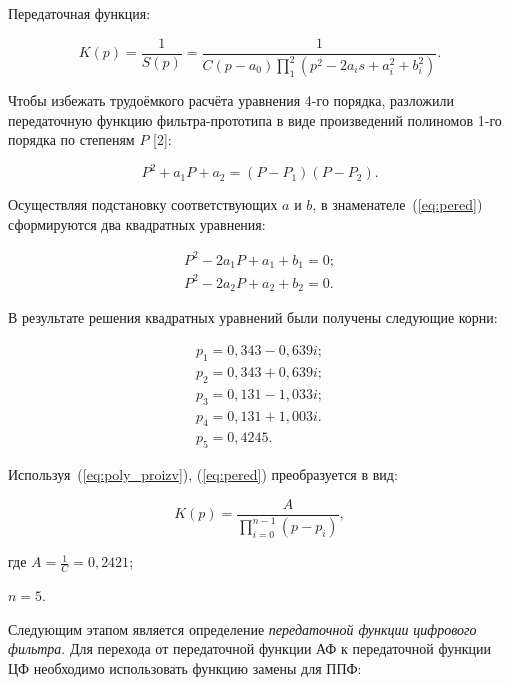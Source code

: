 Передаточная функция:

\begin{equation}
  \label{eq:pered}
  K(p) = \frac{1}{S(p)} = \frac{1}{C(p-a_0)\prod_1^2(p^2-2a_is+a^2_i+b^2_i)}.
\end{equation}

\point Чтобы избежать трудоёмкого расчёта уравнения 4-го порядка,
разложили передаточную функцию фильтра-прототипа в виде произведений
полиномов 1-го порядка по степеням $P$ [2]:

\begin{equation}
  \label{eq:poly_proizv}
  P^2 + a_1P + a_2 = (P - P_1)(P - P_2).
\end{equation}

Осуществляя подстановку соответствующих $a$ и $b$, в
знаменателе~(\ref{eq:pered}) сформируются два квадратных уравнения:

\begin{gather*}
  P^2 - 2a_1P + a_1 + b_1 = 0;\\
  P^2 - 2a_2P + a_2 + b_2 = 0.
\end{gather*}

В результате решения квадратных уравнений были получены следующие
корни:

\begin{gather*}
  p_1 = 0{,}343 - 0{,}639i;\\
  p_2 = 0{,}343 + 0{,}639i;\\
  p_3 = 0{,}131 - 1{,}033i;\\
  p_4 = 0{,}131 + 1{,}003i.\\
  p_5 = 0{,}4245.
\end{gather*}

Используя~(\ref{eq:poly_proizv}), (\ref{eq:pered}) преобразуется в
вид:

\begin{equation}
  \label{eq:pered_proizv_poly}
  K(p) = \frac{A}{\prod_{i=0}^{n-1}(p-p_i)},
\end{equation}

\begin{ESKDexplanation}
\item[где ] $A = \frac{1}{C} = 0{,}2421$;
\item $n = 5$.
\end{ESKDexplanation}

\point Следующим этапом является определение \textit{передаточной
  функции} \emph{цифрового фильтра}. Для перехода от передаточной
функции АФ к передаточной функции ЦФ необходимо использовать функцию
замены для ППФ:

